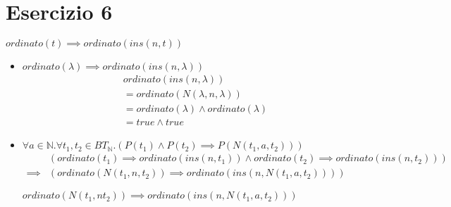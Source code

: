 \documentclass{article}
\begin{document}
\section{Esercizio 6}
\(ordinato(t) \implies ordinato(ins(n,t))\)

\begin{itemize}
    \item \(ordinato(\lambda) \implies ordinato(ins(n, \lambda))\)
          \begin{align*}
               & ordinato(ins(n, \lambda))                   \\
               & = ordinato(N(\lambda, n, \lambda))          \\
               & = ordinato(\lambda) \land ordinato(\lambda) \\
               & = true \land true
          \end{align*}

    \item \(\forall a \in \mathbb{N} . \forall t_1,t_2 \in BT_\mathbb{N} . (P(t_1) \land P(t_2) \implies P(N(t_1,a,t_2)))\)
          \begin{align*}
                       & (ordinato(t_1) \implies ordinato(ins(n,t_1)) \land ordinato(t_2) \implies ordinato(ins(n, t_2))) \\
              \implies & (ordinato(N(t_1,n,t_2)) \implies ordinato(ins(n, N(t_1, a, t_2))))
          \end{align*}

          \(ordinato(N(t_1,nt_2)) \implies ordinato(ins(n, N(t_1, a, t_2)))\)
\end{itemize}
\end{document}
